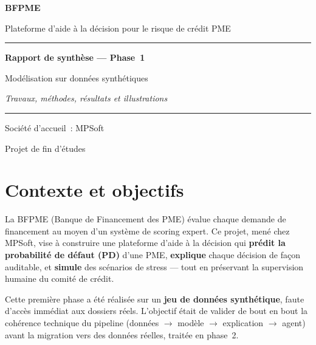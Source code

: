 \documentclass[a4paper,11pt]{article}
\begin{document}
\begin{titlepage}
\centering
\vspace*{2cm}
{\Huge\bfseries\color{BfRed} BFPME\par}
\vspace{0.4cm}
{\Large Plateforme d'aide à la décision pour le risque de crédit PME\par}
\vspace{1.2cm}
\rule{0.8\textwidth}{1.5pt}\par
\vspace{0.8cm}
{\LARGE\bfseries Rapport de synthèse — Phase~1\par}
\vspace{0.3cm}
{\large Modélisation sur données synthétiques\par}
\vspace{0.6cm}
{\large\itshape Travaux, méthodes, résultats et illustrations\par}
\vspace{1cm}
\rule{0.8\textwidth}{1.5pt}\par
\vfill
{\large Société d'accueil~: MPSoft\par}
{\large Projet de fin d'études\par}
\vspace{1cm}
\end{titlepage}

\tableofcontents
\newpage

\section{Contexte et objectifs}

La BFPME (Banque de Financement des PME) évalue chaque demande de financement au moyen d'un
système de scoring expert. Ce projet, mené chez MPSoft, vise à construire une plateforme
d'aide à la décision qui \textbf{prédit la probabilité de défaut (PD)} d'une PME, \textbf{explique}
chaque décision de façon auditable, et \textbf{simule} des scénarios de stress — tout en
préservant la supervision humaine du comité de crédit.

Cette première phase a été réalisée sur un \textbf{jeu de données synthétique}, faute d'accès
immédiat aux dossiers réels. L'objectif était de valider de bout en bout la cohérence technique
du pipeline (données $\rightarrow$ modèle $\rightarrow$ explication $\rightarrow$ agent) avant
la migration vers des données réelles, traitée en phase~2.
\end{document}
